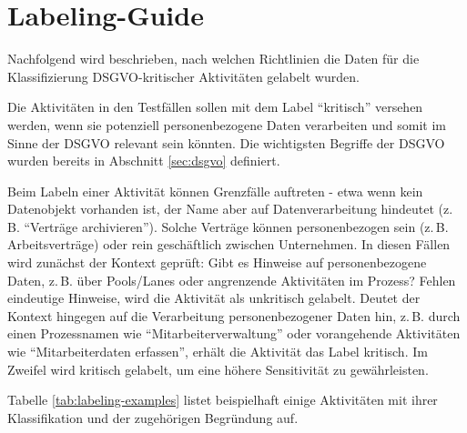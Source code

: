\section{Labeling-Guide}\label{sec:labeling-guide}

Nachfolgend wird beschrieben, nach welchen Richtlinien die Daten für die Klassifizierung \ac{DSGVO}-kritischer Aktivitäten gelabelt wurden.

Die Aktivitäten in den Testfällen sollen mit dem Label \enquote{kritisch} versehen werden, wenn sie potenziell personenbezogene Daten verarbeiten und somit im Sinne der \ac{DSGVO} relevant sein könnten. Die wichtigsten Begriffe der \ac{DSGVO} wurden bereits in Abschnitt \ref{sec:dsgvo} definiert.

Beim Labeln einer Aktivität können Grenzfälle auftreten - etwa wenn kein Datenobjekt vorhanden ist, der Name aber auf Datenverarbeitung hindeutet (z.\,B. \enquote{Verträge archivieren}). Solche Verträge können personenbezogen sein (z.\,B. Arbeitsverträge) oder rein geschäftlich zwischen Unternehmen. In diesen Fällen wird zunächst der Kontext geprüft: Gibt es Hinweise auf personenbezogene Daten, z.\,B. über Pools/Lanes oder angrenzende Aktivitäten im Prozess? Fehlen eindeutige Hinweise, wird die Aktivität als unkritisch gelabelt. Deutet der Kontext hingegen auf die Verarbeitung personenbezogener Daten hin, z.\,B. durch einen Prozessnamen wie \enquote{Mitarbeiterverwaltung} oder vorangehende Aktivitäten wie \enquote{Mitarbeiterdaten erfassen}, erhält die Aktivität das Label kritisch. Im Zweifel wird kritisch gelabelt, um eine höhere Sensitivität zu gewährleisten.

Tabelle \ref{tab:labeling-examples} listet beispielhaft einige Aktivitäten mit ihrer Klassifikation und der zugehörigen Begründung auf.

